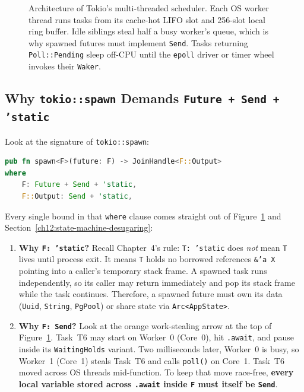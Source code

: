\begin{figure}[H]
\caption{Architecture of Tokio's multi-threaded scheduler. Each OS worker thread runs tasks from its cache-hot LIFO slot and 256-slot local ring buffer. Idle siblings steal half a busy worker's queue, which is why spawned futures must implement \texttt{Send}. Tasks returning \texttt{Poll::Pending} sleep off-CPU until the \texttt{epoll} driver or timer wheel invokes their \texttt{Waker}.}
\label{ch12:fig-tokio-runtime}
\end{figure}

\subsection{Why \texttt{tokio::spawn} Demands \texttt{Future + Send + 'static}}

Look at the signature of \texttt{tokio::spawn}:

\begin{lstlisting}[language=Rust]
pub fn spawn<F>(future: F) -> JoinHandle<F::Output>
where
    F: Future + Send + 'static,
    F::Output: Send + 'static,
\end{lstlisting}

Every single bound in that \texttt{where} clause comes straight out of Figure~\ref{ch12:fig-tokio-runtime} and Section~\ref{ch12:state-machine-desugaring}:
\begin{enumerate}
  \item \textbf{Why \texttt{F: 'static}?} Recall Chapter~4's rule: \texttt{T: 'static} does \emph{not} mean \texttt{T} lives until process exit. It means \texttt{T} holds no borrowed references \texttt{\&'a X} pointing into a caller's temporary stack frame. A spawned task runs independently, so its caller may return immediately and pop its stack frame while the task continues. Therefore, a spawned future must own its data (\texttt{Uuid}, \texttt{String}, \texttt{PgPool}) or share state via \texttt{Arc<AppState>}.
  \item \textbf{Why \texttt{F: Send}?} Look at the orange work-stealing arrow at the top of Figure~\ref{ch12:fig-tokio-runtime}. Task~T6 may start on Worker~0 (Core~0), hit \texttt{.await}, and pause inside its \texttt{WaitingHolds} variant. Two milliseconds later, Worker~0 is busy, so Worker~1 (Core~1) steals Task~T6 and calls \texttt{poll()} on Core~1. Task~T6 moved across OS threads mid-function. To keep that move race-free, \textbf{every local variable stored across \texttt{.await} inside \texttt{F} must itself be \texttt{Send}}.
\end{enumerate}

